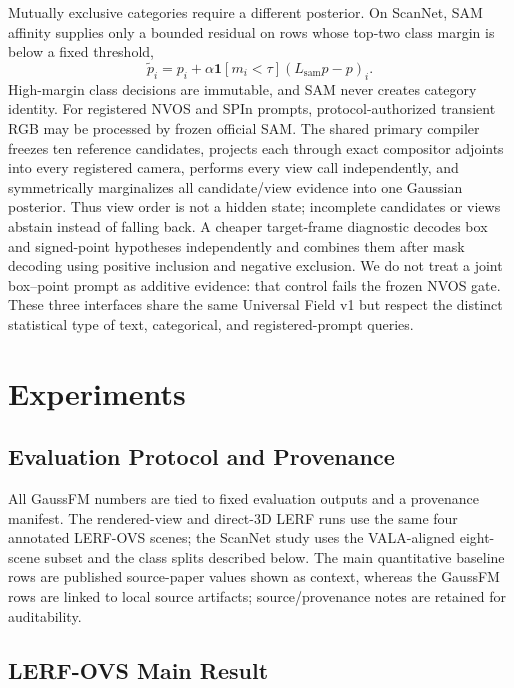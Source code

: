 \documentclass[journal,twoside]{IEEEtran}
\newcommand{\method}{GaussFM}
\begin{document}
Mutually exclusive categories require a different posterior.  On ScanNet, SAM
affinity supplies only a bounded residual on rows whose top-two class margin is
below a fixed threshold,
\begin{equation}
 \tilde p_i=p_i+\alpha\mathbf 1[m_i<\tau]
 (L_{\mathrm{sam}}p-p)_i.
\end{equation}
High-margin class decisions are immutable, and SAM never creates category
identity.  For registered NVOS and SPIn prompts, protocol-authorized transient
RGB may be processed by frozen official SAM.  The shared primary compiler
freezes ten reference candidates, projects each through exact compositor
adjoints into every registered camera, performs every view call independently,
and symmetrically marginalizes all candidate/view evidence into one Gaussian
posterior.  Thus view order is not a hidden state; incomplete candidates or
views abstain instead of falling back.  A cheaper target-frame diagnostic
decodes box and signed-point hypotheses independently and combines them after
mask decoding using positive inclusion and negative exclusion.  We do not
treat a joint box--point prompt as additive evidence: that control fails the
frozen NVOS gate.  These three interfaces share the same Universal Field v1 but
respect the distinct statistical type of text, categorical, and
registered-prompt queries.

\section{Experiments}

\subsection{Evaluation Protocol and Provenance}

All \method{} numbers are tied to fixed evaluation outputs and a provenance
manifest. The rendered-view and direct-3D LERF runs use the same four annotated
LERF-OVS scenes; the ScanNet study uses the VALA-aligned eight-scene subset and
the class splits described below. The main quantitative baseline rows are
published source-paper values shown as context, whereas the \method{} rows are
linked to local source artifacts; source/provenance notes are retained for
auditability.

\subsection{LERF-OVS Main Result}
\end{document}
